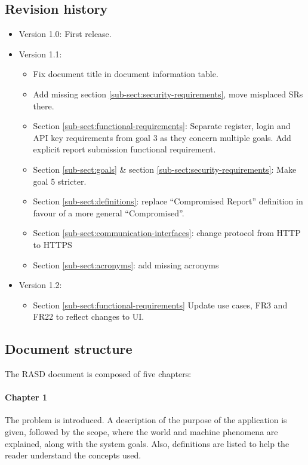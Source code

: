 \subsection{Revision history}
\begin{itemize}
    \item Version 1.0: First release.
    \item Version 1.1: 
        \begin{itemize}
            \item Fix document title in document information table.
            \item Add missing section \ref{sub-sect:security-requirements}, move misplaced SRs there.
            \item Section \ref{sub-sect:functional-requirements}: Separate register, login and API key requirements from goal 3 as they concern multiple goals. Add explicit report submission functional requirement.
            \item Section \ref{sub-sect:goals} \& section \ref{sub-sect:security-requirements}: Make goal 5 stricter.
            \item Section \ref{sub-sect:definitions}: replace “Compromised Report” definition in favour of a more general “Compromised”.
            \item Section \ref{sub-sect:communication-interfaces}: change protocol from HTTP to HTTPS
            \item Section \ref{sub-sect:acronyms}: add missing acronyms
        \end{itemize}
    \item Version 1.2:
        \begin{itemize}
            \item Section \ref{sub-sect:functional-requirements} Update use cases, FR3 and FR22 to reflect changes to UI.
        \end{itemize}
\end{itemize}

\subsection{Document structure}
The RASD document is composed of five chapters:

\paragraph{Chapter 1} The problem is introduced. A description of the purpose of the application is given, followed by the scope, where the world and machine phenomena are explained, along with the system goals. Also, definitions are listed to help the reader understand the concepts used.

